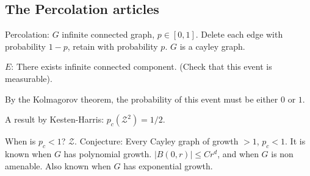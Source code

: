 \subsection{The Percolation articles}

Percolation: $G$ infinite connected graph, $p \in [0,1]$.
Delete each edge with probability $1-p$, retain with probability $p$.
$G$ is a cayley graph.

$E$: There exists infinite connected component. (Check that this event is
measurable).

By the Kolmagorov theorem, the probability of this event must be either $0$ or
$1$.

A result by Kesten-Harris: $p_c(\mathcal{Z}^2) = 1/2$.


When is $p_c < 1$? $\mathcal{Z}$.
Conjecture: Every Cayley graph of growth $>1$, $p_c < 1$.
It is known when $G$ has polynomial growth. $|B(0,r)| \leq Cr^d$, and when $G$
is non amenable. Also known when $G$ has exponential growth.
